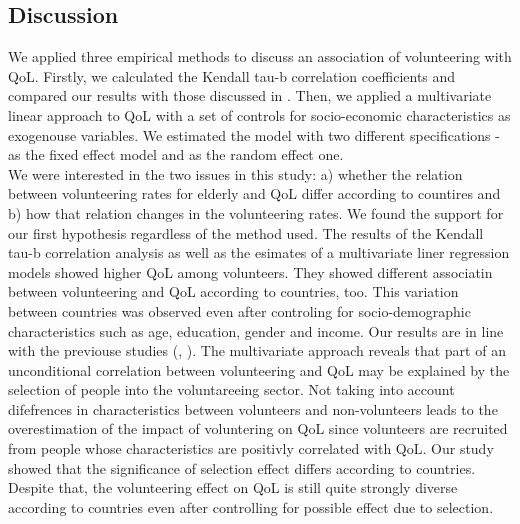 \documentclass[10pt, letterpaper]{article}
\begin{document}
\begin{spacing}{1.4}
 
\section{Discussion}

We applied three empirical methods to discuss an association of volunteering with QoL. Firstly, we calculated the Kendall tau-b correlation coefficients and compared  our results with those discussed in \citet{haski09}. Then, we applied a multivariate linear approach to QoL with a set of controls for socio-economic characteristics as exogenouse variables. We estimated the model with two different specifications -  as the fixed effect model and as the random effect one.\\

We were interested in the two issues in this study: a) whether the relation between volunteering rates for elderly and QoL differ according to countires and b) how that relation changes in the volunteering rates. We found the support for our first hypothesis regardless of the method used. The results of the Kendall tau-b correlation analysis as well as the esimates of a multivariate liner regression models showed higher QoL among volunteers. They showed different associatin between volunteering and QoL according to countries, too. This variation between countries was observed even after controling for socio-demographic characteristics such as age, education, gender and income. Our results are in line with the previouse studies (\citet{haski09}, \citet{plagnol10}). The multivariate approach reveals that part of an unconditional correlation between volunteering and QoL may be explained by the selection of people into the voluntareeing sector. Not taking into account difefrences in characteristics between volunteers and non-volunteers leads to the overestimation of the impact of voluntering on QoL since volunteers are recruited from people whose characteristics are positivly correlated with QoL. Our study showed that the significance of selection effect differs according to countries. Despite that, the volunteering effect on QoL is still quite strongly diverse according to countries even after controlling for possible effect due to selection. \\


\end{spacing}
\end{document}
